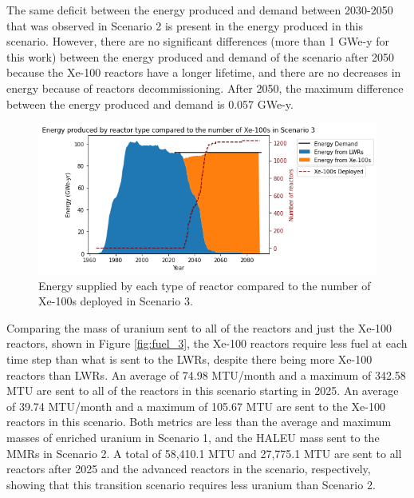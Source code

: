 The same deficit between the energy produced and demand between 
2030-2050 that was observed in Scenario 2 is present in the energy produced 
in this scenario. However, there are no significant 
differences (more than 1 GWe-y for this work) between the energy 
produced and demand of the scenario 
after 2050 because the Xe-100 reactors have a longer lifetime, and there are 
no decreases in energy because of reactors decommissioning. After 2050, the 
maximum difference between the energy produced and demand is 0.057 GWe-y. 

\begin{figure}
    \centering 
    \includegraphics[width=\textwidth]{../figures/energy_scenario3.png}
    \caption{Energy supplied by each type of reactor compared to the number of 
    Xe-100s deployed in Scenario 3.}
    \label{fig:energy_rx_3}
\end{figure}

Comparing the mass of uranium sent to all of the reactors and just the Xe-100 
reactors, shown in Figure \ref{fig:fuel_3}, the Xe-100 reactors 
require less fuel at each time step than what is sent to the \glspl{LWR}, 
despite there being more Xe-100 reactors than \glspl{LWR}. An average of 
74.98 MTU/month and a maximum of 342.58 MTU are sent to all of the reactors 
in this scenario starting in 2025. An average of 39.74 
MTU/month and a maximum of 105.67 MTU are sent to the Xe-100 reactors in 
this scenario. Both metrics are less than the 
average and maximum masses of enriched uranium  
in Scenario 1, and the \gls{HALEU} mass sent to the \glspl{MMR} in 
Scenario 2. A total of 58,410.1 MTU and 27,775.1 MTU are sent to 
all reactors after 2025 and the advanced reactors in the scenario, respectively, 
showing
that this transition scenario requires less uranium than Scenario 2. 

